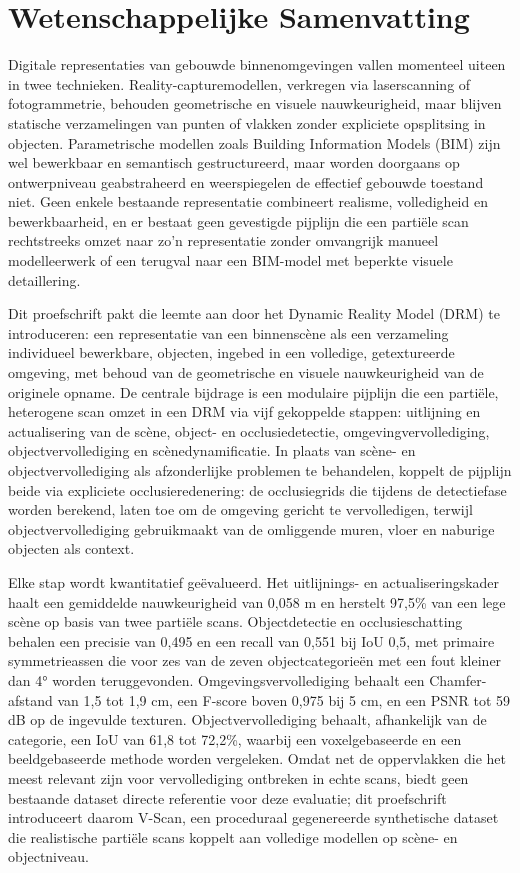 \chapter*{Wetenschappelijke Samenvatting}

Digitale representaties van gebouwde binnenomgevingen vallen momenteel uiteen in twee technieken. Reality-capturemodellen, verkregen via laserscanning of fotogrammetrie, behouden geometrische en visuele nauwkeurigheid, maar blijven statische verzamelingen van punten of vlakken zonder expliciete opsplitsing in objecten. Parametrische modellen zoals Building Information Models (BIM) zijn wel bewerkbaar en semantisch gestructureerd, maar worden doorgaans op ontwerpniveau geabstraheerd en weerspiegelen de effectief gebouwde toestand niet. Geen enkele bestaande representatie combineert realisme, volledigheid en bewerkbaarheid, en er bestaat geen gevestigde pijplijn die een partiële scan rechtstreeks omzet naar zo'n representatie zonder omvangrijk manueel modelleerwerk of een terugval naar een BIM-model met beperkte visuele detaillering.

Dit proefschrift pakt die leemte aan door het Dynamic Reality Model (DRM) te introduceren: een representatie van een binnenscène als een verzameling individueel bewerkbare, objecten, ingebed in een volledige, getextureerde omgeving, met behoud van de geometrische en visuele nauwkeurigheid van de originele opname. De centrale bijdrage is een modulaire pijplijn die een partiële, heterogene scan omzet in een DRM via vijf gekoppelde stappen: uitlijning en actualisering van de scène, object- en occlusiedetectie, omgevingvervollediging, objectvervollediging en scènedynamificatie. In plaats van scène- en objectvervollediging als afzonderlijke problemen te behandelen, koppelt de pijplijn beide via expliciete occlusieredenering: de occlusiegrids die tijdens de detectiefase worden berekend, laten toe om de omgeving gericht te vervolledigen, terwijl objectvervollediging gebruikmaakt van de omliggende muren, vloer en naburige objecten als context.

Elke stap wordt kwantitatief geëvalueerd. Het uitlijnings- en actualiseringskader haalt een gemiddelde nauwkeurigheid van 0,058 m en herstelt 97,5\% van een lege scène op basis van twee partiële scans. Objectdetectie en occlusieschatting behalen een precisie van 0,495 en een recall van 0,551 bij IoU 0,5, met primaire symmetrieassen die voor zes van de zeven objectcategorieën met een fout kleiner dan 4° worden teruggevonden. Omgevingsvervollediging behaalt een Chamfer-afstand van 1,5 tot 1,9 cm, een F-score boven 0,975 bij 5 cm, en een PSNR tot 59 dB op de ingevulde texturen. Objectvervollediging behaalt, afhankelijk van de categorie, een IoU van 61,8 tot 72,2\%, waarbij een voxelgebaseerde en een beeldgebaseerde methode worden vergeleken. Omdat net de oppervlakken die het meest relevant zijn voor vervollediging ontbreken in echte scans, biedt geen bestaande dataset directe referentie voor deze evaluatie; dit proefschrift introduceert daarom V-Scan, een proceduraal gegenereerde synthetische dataset die realistische partiële scans koppelt aan volledige modellen op scène- en objectniveau.

